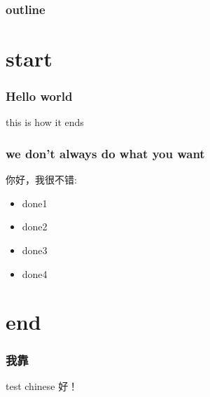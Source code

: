 \documentclass[xcolor=x11names,compress]{beamer}
\begin{document}
\maketitle
\begin{frame}
    \frametitle{outline}
    \tableofcontents[pausesections]                                                                                 
\end{frame}
\section{start}
\begin{frame}
\frametitle{Hello world}
this is how it ends
\end{frame}

\begin{frame}
\frametitle{we don't always do what you want}
你好，我很不错:
\begin{itemize}
    \item done1
    \item done2
    \item done3
    \item done4
\end{itemize}
\end{frame}
\section{end}
\begin{frame}
\frametitle{我靠}
\begin{block}{test chinese}
好！
\end{block}
\end{frame}
\end{document}
